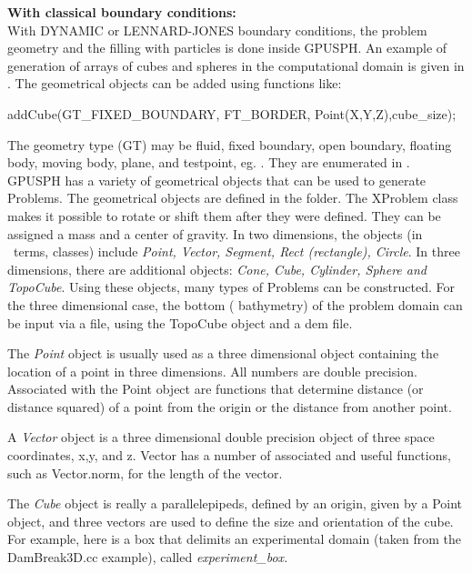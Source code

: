 \documentclass{../GPUSPHtemplate}
\begin{document}
\textbf{With classical boundary conditions:}\\

With DYNAMIC or LENNARD-JONES boundary conditions, the
problem geometry and the filling with particles is done
inside GPUSPH. An example of generation of arrays
of cubes and spheres in the computational domain is given in
. 
The geometrical objects can be added using functions like:
\begin{ccode}
addCube(GT_FIXED_BOUNDARY, FT_BORDER,
             Point(X,Y,Z),cube_size);
\end{ccode}
The geometry type (GT) may be fluid, fixed boundary, open boundary, 
floating body, moving body, plane, and testpoint, eg. . 
They are enumerated in .\\


GPUSPH has a variety of geometrical objects that can be used to generate Problems.
The geometrical objects are defined in the  folder.
The XProblem class makes it possible to rotate or shift them after they were defined.
They can be assigned a mass and a center of gravity.
In two dimensions, the objects (in \cpp\ terms, classes) include {\em
Point, Vector, Segment, Rect (rectangle), Circle}. In three
dimensions, there are additional objects: {\em Cone, Cube, Cylinder,
Sphere and TopoCube}. Using these objects, many types of Problems can
be constructed. For the three dimensional case, the bottom (
bathymetry) of the problem domain can be input via a file, using the
TopoCube object and a dem file.

The {\em Point} object is usually used as a three dimensional object
containing the location of a point in three dimensions. All numbers are
double precision. Associated with the Point object are functions that
determine distance (or distance squared) of a point from the origin or
the distance from another point.

A {\em Vector} object is a three dimensional double precision object of
three space coordinates, x,y, and z. Vector has a number of associated
and useful functions, such as Vector.norm, for the length of the vector.


The {\em Cube} object is really a parallelepipeds, defined by an origin,
given by a Point object, and three vectors are used to define the size
and orientation of the cube. For example, here is a box that delimits
an experimental domain (taken from the DamBreak3D.cc example), called
{\em experiment\_box.} \\
\end{document}
